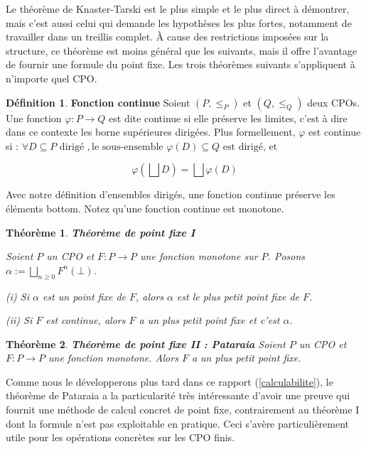\documentclass{article}
\newcommand{\yz}[1]{\textcolor{blue}{{[YZ:~#1]}}}
\newtheorem{theorem}{Théorème}[section]
\theoremstyle{definition}
\newtheorem{definition}{Définition}[section]
\begin{document}
Le théorème de Knaster-Tarski est le plus simple et le plus direct à démontrer, mais c'est aussi celui qui demande les hypothèses les plus fortes, notamment de travailler dans un treillis complet. À cause des restrictions imposées sur la structure, ce théorème est moins général que les suivants, mais il offre l'avantage de fournir une formule du point fixe. Les trois théorèmes suivants s'appliquent à n'importe quel CPO.

\begin{definition}{\textbf{Fonction continue}}
Soient $(P, \leq_P)$ et $(Q, \leq_Q)$ deux CPOs. Une fonction $\varphi : P \rightarrow Q$ est dite continue si elle préserve les limites, c'est à dire dans ce contexte les borne supérieures dirigées. Plus formellement, $\varphi$ est continue si :
$\forall D \subseteq P \text{ dirigé }, \text{le sous-ensemble } \varphi(D) \subseteq Q \text{ est dirigé, et }$

$$ \varphi(\bigsqcup D) = \bigsqcup \varphi(D) $$ 

Avec notre définition d'ensembles dirigés, une fonction continue préserve les éléments bottom.
Notez qu'une fonction continue est monotone.
\end{definition}

\begin{theorem}{\textbf{Théorème de point fixe I}}

Soient $P$ un CPO et $F : P \rightarrow P$ une fonction monotone sur $P$. Posons $\alpha := \bigsqcup_{n \geq 0}F^n(\bot)$.

(i) Si $\alpha$ est un point fixe de $F$, alors $\alpha$ est le plus petit point fixe de $F$.

(ii) Si $F$ est continue, alors $F$ a un plus petit point fixe et c'est $\alpha$.

\end{theorem}

\begin{theorem}{\textbf{Théorème de point fixe II : Pataraia}}
Soient $P$ un CPO et $F : P \rightarrow P$ une fonction monotone. Alors $F$ a un plus petit point fixe.
\end{theorem}

Comme nous le développerons plus tard dans ce rapport (\ref{calculabilite}), le théorème de Pataraia a
la particularité très intéressante d'avoir une preuve qui fournit une méthode de calcul concret de point fixe, contrairement au théorème I dont la formule n'est pas exploitable en pratique. Ceci s'avère particulièrement utile pour les opérations concrètes sur les CPO finis. %
\end{document}
